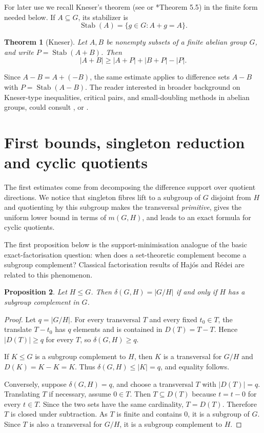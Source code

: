 \documentclass[reqno]{amsart}
\numberwithin{equation}{section}
\newtheorem{theorem}{Theorem}[section]
\newtheorem{proposition}[theorem]{Proposition}
\theoremstyle{definition}
\begin{document}
For later use we recall Kneser's theorem (see \cite{Kneser1955AbelscheGruppen} or \cite{TaoVu2006}*{Theorem 5.5}) in the finite form needed below.  If
$A\subseteq G$, its stabilizer is
\[
  \operatorname{Stab}(A)=\{g\in G:A+g=A\}.
\]

\begin{theorem}[Kneser]
\label{thm:kneser}
Let $A,B$ be nonempty subsets of a finite abelian group $G$, and write
  $P=\operatorname{Stab}(A+B)$.
Then
\[
  |A+B|\geq |A+P|+|B+P|-|P|.
\]
\end{theorem}

Since $A-B=A+(-B)$, the same estimate applies to difference sets
$A-B$ with $P=\operatorname{Stab}(A-B)$. The reader interested in broader background on Kneser-type inequalities, critical
pairs, and small-doubling methods in abelian groups, could consult
\cite{Kemperman1960}, \cite {TaoVu2006} or \cite{Grynkiewicz2013StructuralAdditiveTheory}.

\section{First bounds, singleton reduction and cyclic quotients}
\label{sec:first-bounds-cyclic}

The first estimates come from decomposing the difference support over quotient
directions. We notice that singleton fibres lift to a subgroup of
$G$ disjoint from $H$ and  quotienting by this subgroup makes the transversal
\textit{primitive}, gives the uniform lower bound in terms of $m(G,H)$, and leads to an
exact formula for cyclic quotients.


The first proposition below is the support-minimisation analogue of the basic
exact-factorisation question: when does a set-theoretic complement become
a subgroup complement? Classical factorisation results of Hajós \cite{Hajos1942} and Rédei \cite{Redei1965} are related to this phenomenon.

\begin{proposition}
\label{prop:complement-criterion}
Let $H\leq G$.  Then
$
  \delta(G,H)=|G/H|$
if and only if $H$ has a subgroup complement in $G$.
\end{proposition}

\begin{proof}
Let $q=|G/H|$.  For every transversal $T$ and every fixed $t_0\in T$, the
translate $T-t_0$ has $q$ elements and is contained in $D(T)=T-T$.  Hence
$|D(T)|\ge q$ for every $T$, so $\delta(G,H)\ge q$.

If $K\leq G$ is a subgroup complement to $H$, then $K$ is a transversal for
$G/H$ and $D(K)=K-K=K$. Thus $\delta(G,H)\le |K|=q$, and equality follows.

Conversely, suppose $\delta(G,H)=q$, and choose a transversal $T$ with
$|D(T)|=q$.  Translating $T$ if necessary, assume $0\in T$.  Then
$T\subseteq D(T)$ because $t=t-0$ for every $t\in T$.  Since the two sets have
the same cardinality, $T=D(T)$.  Therefore $T$ is closed under subtraction.
As $T$ is finite and contains $0$, it is a subgroup of $G$.  Since $T$ is also a
transversal for $G/H$, it is a subgroup complement to $H$.
\end{proof}
\end{document}
